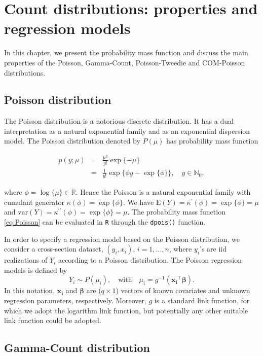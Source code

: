 \documentclass[9pt,a5paper,]{book}
\theoremstyle{definition}
\theoremstyle{definition}
\theoremstyle{remark}
\begin{document}
\chapter{Count distributions: properties and regression
models}\label{models}

In this chapter, we present the probability mass function and discuss
the main properties of the Poisson, Gamma-Count, Poisson-Tweedie and
COM-Poisson distributions.

\section{Poisson distribution}\label{poisson-distribution}

The Poisson distribution is a notorious discrete distribution. It has a
dual interpretation as a natural exponential family and as an
exponential dispersion model. The Poisson distribution denoted by
\(P(\mu)\) has probability mass function

\begin{eqnarray}
p(y;\mu) &=& \frac{\mu^y}{y!}\exp\{-\mu\} \\
         &=& \frac{1}{y!} \exp \{\phi y -  \exp\{\phi\} \}, \quad y \in \mathbb{N}_{0},
\label{eq:Poisson}
\end{eqnarray}

where \(\phi = \log \{\mu\} \in \mathbb{R}\). Hence the Poisson is a
natural exponential family with cumulant generator
\(\kappa(\phi) = \exp\{\phi\}\). We have
\(\mathrm{E}(Y) = \kappa^{\prime}(\phi) = \exp\{\phi\} = \mu\) and
\(\mathrm{var}(Y) = \kappa^{\prime \prime}(\phi) = \exp\{\phi\} = \mu\).
The probability mass function \eqref{eq:Poisson} can be evaluated in
\texttt{R} through the \texttt{dpois()} function.

In order to specify a regression model based on the Poisson
distribution, we consider a cross-section dataset, \((y_i, x_i)\),
\(i = 1,\ldots, n\), where \(y_i\)'s are iid realizations of \(Y_i\)
according to a Poisson distribution. The Poisson regression models is
defined by
\[Y_i \sim P(\mu_i), \quad  \text{with} \quad \mu_i = g^{-1}(\boldsymbol{x_i}^{\top} \boldsymbol{\beta}).\]
In this notation, \(\boldsymbol{x_i}\) and \(\boldsymbol{\beta}\) are
(\(q \times 1\)) vectors of known covariates and unknown regression
parameters, respectively. Moreover, \(g\) is a standard link function,
for which we adopt the logarithm link function, but potentially any
other suitable link function could be adopted.

\section{Gamma-Count distribution}\label{gammacount}
\end{document}
